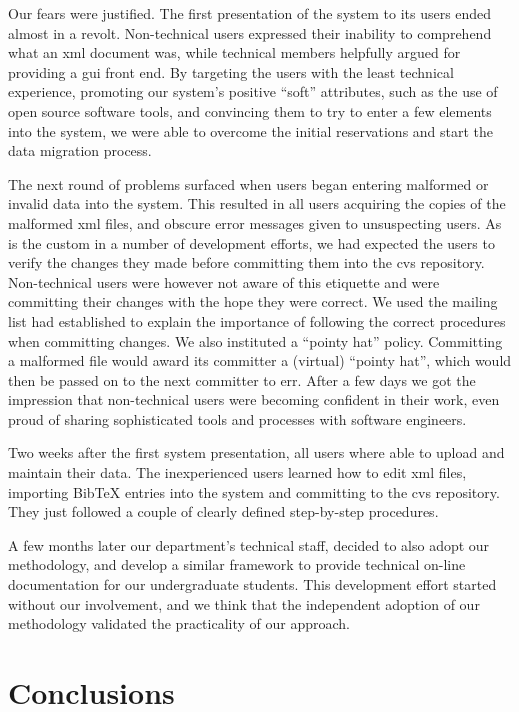 \documentclass{elsart}
\begin{document}
Our fears were justified.
The first presentation of the system to its users ended
almost in a revolt.
Non-technical users expressed their inability to comprehend
what an {\sc xml} document was, while technical members
helpfully argued for providing a {\sc gui} front end.
By targeting the users with the least technical experience,
promoting our system's positive ``soft'' attributes,
such as the use of open source software tools,
and convincing them to try to enter a few elements into
the system, we were able to overcome the initial reservations
and start the data migration process.

The next round of problems surfaced when users began entering
malformed or invalid data into the system.
This resulted in all users acquiring the copies of the malformed
{\sc xml} files, and obscure error messages given to unsuspecting
users.
As is the custom in a number of development efforts, we had
expected the users to verify the changes they made before
committing them into the {\sc cvs} repository.
Non-technical users were however not aware of this etiquette
and were committing their changes with the hope they were correct.
We used the mailing list had established to explain the
importance of following the correct procedures when committing changes.
We also instituted a ``pointy hat'' policy. Committing a malformed file would award 
its committer a (virtual) ``pointy hat'', which would then be passed on to the next committer to err.
After a few days we got the impression that non-technical users
were becoming confident in their work, even proud of sharing
sophisticated tools and processes with software engineers.

Two weeks after the first system presentation,
all users where able to upload and maintain their data.
The inexperienced users learned how to edit {\sc xml} files,
importing {\sc BibTeX} entries into the system and committing to the {\sc cvs} repository. 
They just followed a couple of clearly defined step-by-step procedures.

A few months later our department's technical staff, decided to also adopt our 
methodology, and develop a similar framework to provide technical on-line documentation for our undergraduate students.
This development effort started without our involvement, and we think that the
independent adoption of our methodology validated the practicality of our approach.

\section{Conclusions}
\label{sec:concl}
\end{document}

